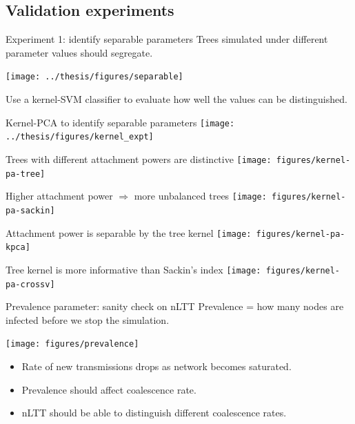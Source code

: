 \documentclass{beamer}
\begin{document}
\subsection{Validation experiments}

\begin{frame}{Experiment 1: identify separable parameters}
  Trees simulated under different parameter values should segregate.

  \texttt{[image: ../thesis/figures/separable]}
  \pause

  Use a kernel-SVM classifier to evaluate how well the values can be
  distinguished.
\end{frame}

\begin{frame}{Kernel-PCA to identify separable parameters}
  \texttt{[image: ../thesis/figures/kernel\_expt]}
\end{frame}

\begin{frame}{Trees with different attachment powers are distinctive}
  \vspace{-0.5cm}
  \texttt{[image: figures/kernel-pa-tree]}
\end{frame}

\begin{frame}{Higher attachment power $\Rightarrow$ more unbalanced trees}
  \vspace{-0.5cm}
  \texttt{[image: figures/kernel-pa-sackin]}
\end{frame}

\begin{frame}{Attachment power is separable by the tree kernel}
  \vspace{-0.5cm}
  \texttt{[image: figures/kernel-pa-kpca]}
\end{frame}

\begin{frame}{Tree kernel is more informative than Sackin's index}
  \vspace{-0.5cm}
  \texttt{[image: figures/kernel-pa-crossv]}
\end{frame}

\begin{frame}{Prevalence parameter: sanity check on nLTT}
  Prevalence = how many nodes are infected before we stop the simulation.

  \texttt{[image: figures/prevalence]}

  \begin{itemize}
      \pause
    \item Rate of new transmissions drops as network becomes saturated.
      \pause
    \item Prevalence should affect coalescence rate.
      \pause
    \item nLTT should be able to distinguish different coalescence rates.
  \end{itemize}
\end{frame}
\end{document}
